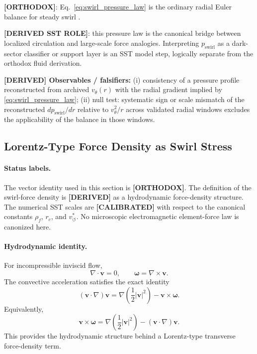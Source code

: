 \documentclass[11pt]{article}
\theoremstyle{definition}
\theoremstyle{plain}
\theoremstyle{remark}
\newcommand{\rhoF}{{\rho_{\!f}}}
\newcommand{\rc}{{r_c}}
\newcommand{\vchar}{v_{\!\boldsymbol{\circlearrowleft}}^{\ast}}
\begin{document}
        \textbf{[ORTHODOX]}: Eq.~\eqref{eq:swirl_pressure_law} is the ordinary radial Euler balance for steady swirl \cite{Batchelor1967,Saffman1992}.

        \textbf{[DERIVED SST ROLE]}: this pressure law is the canonical bridge between localized circulation and large-scale force analogies. Interpreting $p_{\mathrm{swirl}}$ as a dark-sector classifier or support layer is an SST model step, logically separate from the orthodox fluid derivation.

        \textbf{[DERIVED] Observables / falsifiers:} (i) consistency of a pressure profile reconstructed from archived $v_\theta(r)$ with the radial gradient implied by \eqref{eq:swirl_pressure_law}; (ii) null test: systematic sign or scale mismatch of the reconstructed $dp_{\mathrm{swirl}}/dr$ relative to $v_\theta^2/r$ across validated radial windows excludes the applicability of the balance in those windows.

    \subsection{Lorentz-Type Force Density as Swirl Stress}
    \label{sec:lorentz_type_force_density_as_swirl_stress}

        \paragraph{Status labels.}
        The vector identity used in this section is \textbf{[ORTHODOX]}.  The
        definition of the swirl-force density is \textbf{[DERIVED]} as a hydrodynamic
        force-density structure.  The numerical SST scales are \textbf{[CALIBRATED]}
        with respect to the canonical constants
        \(\rhoF\), \(\rc\), and \(\vchar\).
        No microscopic electromagnetic element-force law is canonized here.

        \paragraph{Hydrodynamic identity.}
        For incompressible inviscid flow,
        \[
        \nabla\cdot\mathbf v=0,
        \qquad
        \boldsymbol{\omega}=\nabla\times\mathbf v .
        \]
        The convective acceleration satisfies the exact identity
        \[
        (\mathbf v\cdot\nabla)\mathbf v
        =
        \nabla\!\left(\frac12|\mathbf v|^2\right)
        -
        \mathbf v\times\boldsymbol{\omega}.
        \]
        Equivalently,
        \[
        \boxed{
        \mathbf v\times\boldsymbol{\omega}
        =
        \nabla\!\left(\frac12|\mathbf v|^2\right)
        -
        (\mathbf v\cdot\nabla)\mathbf v .
        }
        \]
        This provides the hydrodynamic structure behind a Lorentz-type transverse
        force-density term.
\end{document}
